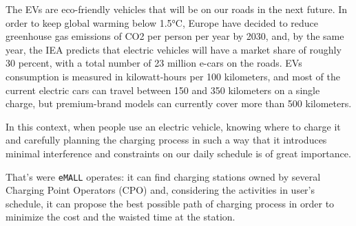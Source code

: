 
The EVs are eco-friendly vehicles that will be on our roads in the next future.
In order to keep global warming below 1.5°C, Europe have decided to reduce greenhouse gas emissions of CO2 per
person per year by 2030, and, by the same year, the IEA predicts that electric vehicles will have a market share
of roughly 30 percent, with a total number of 23 million e-cars on the roads.
EVs consumption is measured in kilowatt-hours per 100 kilometers, and most of the current electric cars can travel
between 150 and 350 kilometers on a single charge, but premium-brand models can currently cover more than 500
kilometers.



In this context, when people use an electric vehicle, knowing where to charge it and carefully planning the
charging process in such a way that it introduces minimal interference and constraints on our daily schedule
is of great importance.

That's were \verb|eMALL| operates: it can find charging stations owned by several Charging Point Operators (CPO) and,
considering the activities in user's schedule, it can propose the best possible path of charging process
in order to minimize the cost and the waisted time at the station.


